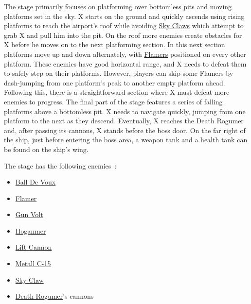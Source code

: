 The stage primarily focuses on platforming over bottomless pits and moving platforms set in the sky. X starts on the ground and quickly ascends using rising platforms to reach the airport's roof while avoiding \hyperlink{enem:Sky_Claw}{Sky Claws} which attempt to grab X and pull him into the pit. On the roof more enemies create obstacles for X before he moves on to the next platforming section. In this next section platforms move up and down alternately, with \hyperlink{enem:Flamer}{Flamers} positioned on every other platform. These enemies have good horizontal range, and X needs to defeat them to safely step on their platforms. However, players can skip some Flamers by dash-jumping from one platform's peak to another empty platform ahead. Following this, there is a straightforward section where X must defeat more enemies to progress. The final part of the stage features a series of falling platforms above a bottomless pit. X needs to navigate quickly, jumping from one platform to the next as they descend. Eventually, X reaches the Death Rogumer and, after passing its cannons, X stands before the boss door. On the far right of the ship, just before entering the boss area, a weapon tank and a health tank can be found on the ship's wing.

The stage has the following enemies~\cite{wiki:Airport}:
\begin{itemize}
	\item \hyperlink{enem:Ball_De_Voux}{Ball De Voux }
	\item \hyperlink{enem:Flamer}{Flamer}
	\item \hyperlink{enem:Gun_Volt}{Gun Volt}
	\item \hyperlink{enem:Hoganmer}{Hoganmer}
	\item \hyperlink{enem:Lift_Cannon}{Lift Cannon}
	\item \hyperlink{enem:Metall_C-15}{Metall C-15}
	\item \hyperlink{enem:Sky_Claw}{Sky Claw}
	\item \hyperlink{vehicle:Death_Rogumer}{Death Rogumer}'s cannons
\end{itemize}

